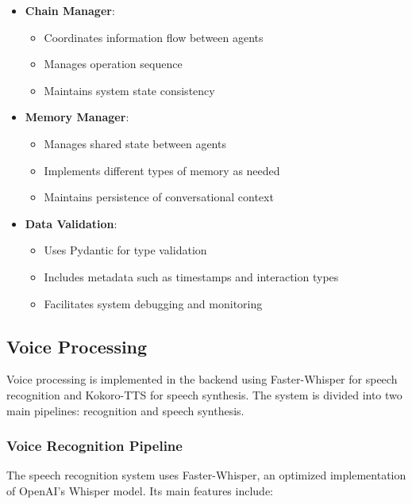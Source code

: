 \begin{itemize}
    \item \textbf{Chain Manager}:
    \begin{itemize}
        \item Coordinates information flow between agents
        \item Manages operation sequence
        \item Maintains system state consistency
    \end{itemize}

    \item \textbf{Memory Manager}:
    \begin{itemize}
        \item Manages shared state between agents
        \item Implements different types of memory as needed
        \item Maintains persistence of conversational context
    \end{itemize}

    \item \textbf{Data Validation}:
    \begin{itemize}
        \item Uses Pydantic for type validation
        \item Includes metadata such as timestamps and interaction types
        \item Facilitates system debugging and monitoring
    \end{itemize}
\end{itemize}

\subsection{Voice Processing}
\label{implementacion-voz}

Voice processing is implemented in the backend using Faster-Whisper for speech recognition and Kokoro-TTS for speech synthesis. The system is divided into two main pipelines: recognition and speech synthesis.

\subsubsection{Voice Recognition Pipeline}

The speech recognition system uses Faster-Whisper, an optimized implementation of OpenAI's Whisper model. Its main features include:

